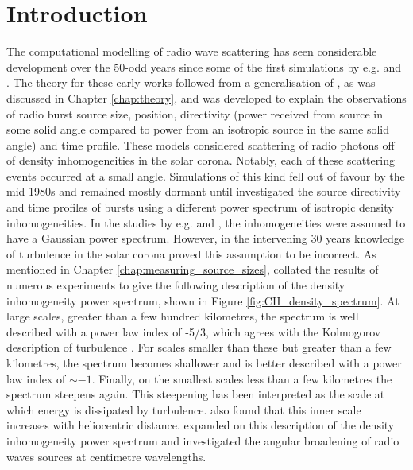 \section{Introduction}
\label{sec:obsvtheory_intro}
The computational modelling of radio wave scattering has seen considerable development over the 50-odd years since some of the first simulations by e.g. \cite{Fokker1965} and \cite{Steinberg1971}. The theory for these early works followed from a generalisation of \cite{Chandrasekhar1952}, as was discussed in Chapter \ref{chap:theory}, and was developed to explain the observations of radio burst source size, position, directivity (power received from source in some solid angle compared to power from an isotropic source in the same solid angle) and time profile. These models considered scattering of radio photons off of density inhomogeneities in the solar corona. Notably, each of these scattering events occurred at a small angle. Simulations of this kind fell out of favour by the mid 1980s and remained mostly dormant until \cite{Thejappa2007} investigated the source directivity and time profiles of bursts using a different power spectrum of isotropic density inhomogeneities. In the studies by e.g. \cite{Fokker1965} and \cite{Steinberg1971}, the inhomogeneities were assumed to have a Gaussian power spectrum. However, in the intervening 30 years knowledge of turbulence in the solar corona proved this assumption to be incorrect. As mentioned in Chapter \ref{chap:measuring_source_sizes}, \cite{Coles1989} collated the results of numerous experiments to give the following description of the density inhomogeneity power spectrum, shown in Figure \ref{fig:CH_density_spectrum}. At large scales, greater than a few hundred kilometres, the spectrum is well described with a power law index of -5/3, which agrees with the Kolmogorov description of turbulence \citep{Kolmogorov1941}. For scales smaller than these but greater than a few kilometres, the spectrum becomes shallower and is better described with a power law index of $\sim -1$. Finally, on the smallest scales less than a few kilometres the spectrum steepens again. This steepening has been interpreted as the scale at which energy is dissipated by turbulence. \cite{Coles1989} also found that this inner scale increases with heliocentric distance. \cite{Bastian1994} expanded on this description of the density inhomogeneity power spectrum and investigated the angular broadening of radio waves sources at centimetre wavelengths.

